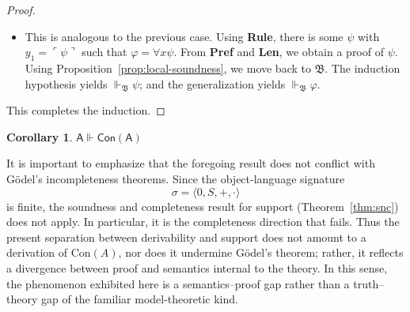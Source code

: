 \documentclass[reqno]{asl}
\newtheorem{corollary}[definition]{Corollary}
\newcommand{\supp}{\Vdash}
\newcommand{\base}[1]{\mathfrak{#1}}
\newcommand{\pa}{\textsf{A}}
\newcommand{\Prf}{\textsf{Prf}}
\newcommand{\Con}{\textsf{Con}}
\newcommand{\Pre}{\textsf{Pref}}
\begin{document}
\begin{proof}
\begin{itemize}
\[\]
By the correctness of the encoding (\textbf{Rule}), there is a formula $\psi$ such that
$ y_1=\ulcorner\psi\urcorner$ and $ y_2=\ulcorner\psi\to\varphi\urcorner$. Let
$p_1:=\Pre(p, i+\bar{1})$ and $p_2:=\Pre(p, j+\bar{1})$; by the prefix closure on proofs (\textbf{Pref}), 
\[
\vdash_{\pa} \Prf(p_1,\ulcorner\psi\urcorner)
\quad\text{and}\quad
\vdash_{\pa} \Prf(p_2,\ulcorner\psi\to\varphi\urcorner)
\]
By local soundness (Proposition~\ref{prop:local-soundness}),
\[
\supp_{\base{B}}  \Prf(p_1,\ulcorner\psi\urcorner)
\quad\text{and}\quad
\supp_{\base{B}} \Prf(p_2,\ulcorner\psi\to\varphi\urcorner)
\]
By the length of prefixes ($\textbf{Len}$), the length of $p_1$ and $p_2$ are less than the length of $p$. Applying IH to each, we obtain
$\supp_{\base{B}}  \psi$ and $\supp_{\base{B}} \psi\to\varphi$. The desired result obtains by \emph{modus ponens}.

\item This is analogous to the previous case. Using \textbf{Rule}, there is some $\psi$ with
$y_1=\ulcorner\psi\urcorner$ such that $\varphi=\forall x \psi$.  From \textbf{Pref} and \textbf{Len}, we obtain a 
proof of $\psi$. Using Proposition~\ref{prop:local-soundness}, we move back to $\base{B}$. The induction hypothesis yields $\supp_{\base{B}}\psi$; and the
generalization yields $\supp_{\base{B}}\varphi$.
\end{itemize}
This completes the induction.
\end{proof}


\begin{corollary}
    $\pa \supp \Con(\pa)$
\end{corollary}


It is important to emphasize that the foregoing result does not conflict with G\"odel's incompleteness theorems. Since the object-language signature 
\[
\sigma=\langle 0,S,+,\cdot\rangle
\]
is finite, the soundness and completeness result for support (Theorem~\ref{thm:snc}) does not apply. In particular, it is the completeness direction that fails. Thus the present separation between derivability and support does not amount to a derivation of $\mathrm{Con}(A)$, nor does it undermine G\"odel's theorem; rather, it reflects a divergence between proof and semantics internal to the theory. In this sense, the phenomenon exhibited here is a semantics--proof gap rather than a truth--theory gap of the familiar model-theoretic kind.
\end{document}
